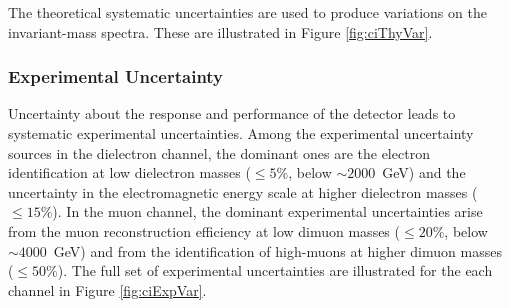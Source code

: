 The theoretical systematic uncertainties are used to produce variations on the invariant-mass spectra.
These are illustrated in Figure \ref{fig:ciThyVar}.



\subsubsection{Experimental Uncertainty}\label{sec:ciExpSyst}

Uncertainty about the response and performance of the detector leads to systematic experimental uncertainties.
Among the experimental uncertainty sources in the dielectron channel, the dominant ones are the electron identification at low dielectron masses ($\leq 5\%$, below $\sim2000$~GeV) and the uncertainty in the electromagnetic energy scale at higher dielectron masses ($\leq 15\%$).
In the muon channel, the dominant experimental uncertainties arise from the muon reconstruction efficiency at low dimuon masses ($\leq 20\%$, below $\sim4000$~GeV) and from the identification of high-\pt muons at higher dimuon masses ($\leq 50\%$).
The full set of experimental uncertainties are illustrated for the each channel in Figure \ref{fig:ciExpVar}.

